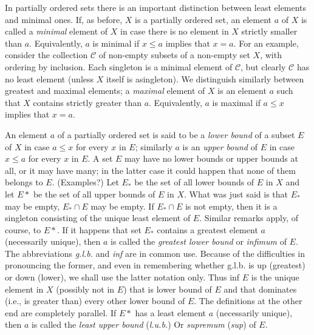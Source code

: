 In partially ordered sets there is an important distinction between least elements and minimal ones. If, as before, $X$ is a partially ordered set, an element $a$ of $X$ is called a \textit{minimal} element of $X$ in case there is no element in $X$ strictly smaller than $a$. Equivalently, $a$ is minimal if $x \le a$ implies that $x = a$. For an example, consider the collection $\mathcal{C}$ of non-empty subsets of a non-empty set $X$, with ordering by inclusion. Each singleton is a minimal element of $\mathcal{C}$, but clearly $\mathcal{C}$ has no least element (unless $X$ itself is asingleton). We distinguish similarly between greatest and maximal elements; a \textit{maximal} element of $X$ is an element $a$ such that $X$ contains strictly greater than $a$. Equivalently, $a$ is maximal if $a \le x$ implies that $x = a$.
 
An element $a$ of a partially ordered set is said to be a \textit{lower bound} of a subset $E$ of $X$ in case $a \le x$ for every $x$ in $E$; similarly $a$ is an \textit{upper bound} of $E$ in case $x \le a$ for every $x$ in $E$. A set $E$ may have no lower bounds or upper bounds at all, or it may have many; in the latter case it could happen that none of them belongs to $E$. (Examples?) Let $E_{*}$ be the set of all lower bounds of $E$ in $X$ and let $E*$ be the set of all upper bounds of $E$ in $X$. What was just said is that $E_{*}$ may be empty, $E_{*} \cap E$ may be empty. If $E_{*} \cap E$ is not empty, then it is a singleton consisting of the unique least element of $E$. Similar remarks apply, of course, to $E*$. If it happens that set $E_{*}$ contains a greatest element $a$ (necessarily unique), then $a$ is called the \textit{greatest lower bound} or \textit{infimum} of $E$. The abbreviations \textit{g.l.b.} and \textit{inf} are in common use. Because of the difficulties in pronouncing the former, and even in remembering whether g.l.b. is up (greatest) or down (lower), we shall use the latter notation only. Thus inf $E$ is the unique element in $X$ (possibly not in $E$) that is lower bound of $E$ and that dominates (i.e., is greater than) every other lower bound of $E$. The definitions at the other end are completely parallel. If $E*$ has a least element $a$ (necessarily unique), then $a$ is called the \textit{least upper bound} (\textit{l.u.b.}) Or \textit{supremum} (\textit{sup}) of $E$. 

